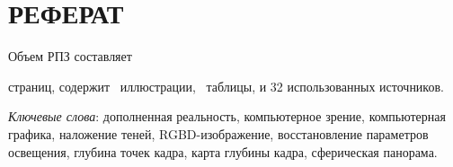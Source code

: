 \chapter*{РЕФЕРАТ}

Объем РПЗ составляет \begin{NoHyper}\pageref{LastPage}\end{NoHyper} страниц, содержит \totfig~иллюстрации, \tottab~таблицы, и 32 использованных источников.

\textit{Ключевые слова}: дополненная реальность, компьютерное зрение, компьютерная графика, наложение теней, RGBD-изображение, восстановление параметров освещения, глубина точек кадра, карта глубины кадра, сферическая панорама.